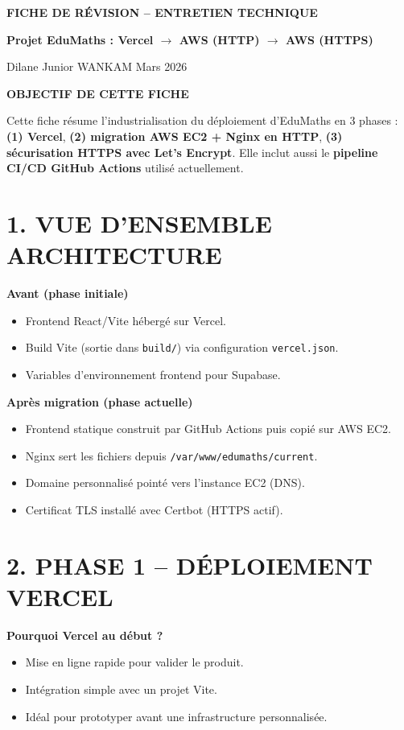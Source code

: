 \documentclass[10pt,a4paper]{article}
\newcommand{\cvheading}[1]{
  \vspace{0.25em}
  {\centering\colorbox{mainblue}{\parbox{0.97\linewidth}{\centering\color{white}\bfseries #1}}\par}
  \vspace{0.25em}
}
\begin{document}
{\centering
  {\LARGE\bfseries FICHE DE R\'EVISION -- ENTRETIEN TECHNIQUE}\par
  \vspace{0.2em}
  {\large\bfseries Projet EduMaths : Vercel $\rightarrow$ AWS (HTTP) $\rightarrow$ AWS (HTTPS)}\par
  \vspace{0.2em}
  \small
  Dilane Junior WANKAM \;\textbullet\; Mars 2026
  \par
}

\cvheading{OBJECTIF DE CETTE FICHE}

Cette fiche r\'esume l'industrialisation du d\'eploiement d'EduMaths en 3 phases :
\textbf{(1) Vercel}, \textbf{(2) migration AWS EC2 + Nginx en HTTP}, \textbf{(3) s\'ecurisation HTTPS avec Let's Encrypt}.
Elle inclut aussi le \textbf{pipeline CI/CD GitHub Actions} utilis\'e actuellement.

\section{1. VUE D'ENSEMBLE ARCHITECTURE}

\textbf{Avant (phase initiale)}
\begin{itemize}
  \item Frontend React/Vite h\'eberg\'e sur Vercel.
  \item Build Vite (sortie dans \texttt{build/}) via configuration \texttt{vercel.json}.
  \item Variables d'environnement frontend pour Supabase.
\end{itemize}

\textbf{Apr\`es migration (phase actuelle)}
\begin{itemize}
  \item Frontend statique construit par GitHub Actions puis copi\'e sur AWS EC2.
  \item Nginx sert les fichiers depuis \texttt{/var/www/edumaths/current}.
  \item Domaine personnalis\'e point\'e vers l'instance EC2 (DNS).
  \item Certificat TLS install\'e avec Certbot (HTTPS actif).
\end{itemize}

\section{2. PHASE 1 -- D\'EPLOIEMENT VERCEL}

\textbf{Pourquoi Vercel au d\'ebut ?}
\begin{itemize}
  \item Mise en ligne rapide pour valider le produit.
  \item Int\'egration simple avec un projet Vite.
  \item Id\'eal pour prototyper avant une infrastructure personnalis\'ee.
\end{itemize}
\end{document}
